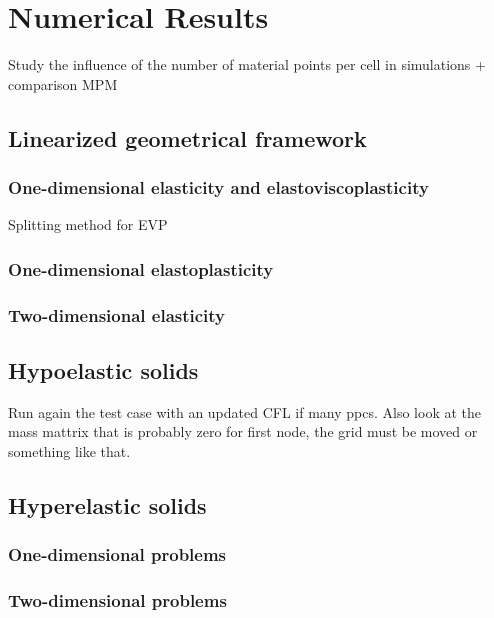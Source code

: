 \chapter{Numerical Results}
Study the influence of the number of material points per cell in simulations + comparison MPM
\section{Linearized geometrical framework}
\subsection{One-dimensional elasticity and elastoviscoplasticity}
Splitting method for EVP
\subsection{One-dimensional elastoplasticity}
\subsection{Two-dimensional elasticity}

\section{Hypoelastic solids}
Run again the test case with an updated CFL if many ppcs. Also look at the mass mattrix that is probably zero for first node, the grid must be moved or something like that.
\section{Hyperelastic solids}
\subsection{One-dimensional problems}
\subsection{Two-dimensional problems}
